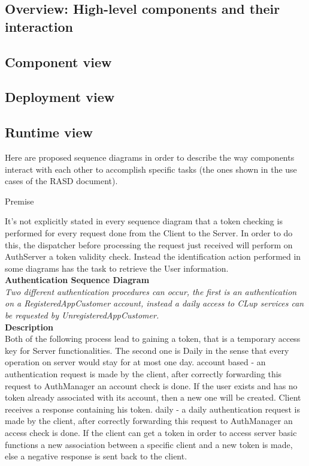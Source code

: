 \subsection{Overview: High-level components and their interaction}

\subsection{Component view}

\subsection{Deployment view}

\subsection{Runtime view}
Here are proposed sequence diagrams in order to describe the way components interact with each other to accomplish specific tasks (the ones shown in the use cases of the RASD document).\\

\begin{center} 
Premise\\
\end{center}
It’s not explicitly stated in every sequence diagram that a token checking is performed for every request done from the Client to the Server. In order to do this, the dispatcher before processing the request just received will perform on AuthServer a token validity check. Instead the identification action performed in some diagrams has the task to retrieve the User information.\\

\newpage
\textbf{Authentication Sequence Diagram\\}
\textit{Two different authentication procedures can occur, the first is an authentication on a RegisteredAppCustomer account, instead a daily access to CLup services can be requested by UnregisteredAppCustomer.\\}
\textbf{Description\\}
Both of the following process lead to gaining a token, that is a temporary access key for Server functionalities. The second one is Daily in the sense that every operation on server would stay for at most one day.
account based - an authentication request is made by the client, after correctly forwarding this request to AuthManager an account check is done. If the user exists and has no token already associated with its account, then a new one will be created. Client receives a response containing his token. 
daily - a daily authentication request is made by the client, after correctly forwarding this request to AuthManager an access check is done. If the client can get a token in order to access server basic functions a new association between a specific client and a new token is made, else a negative response is sent back to the client. \\

